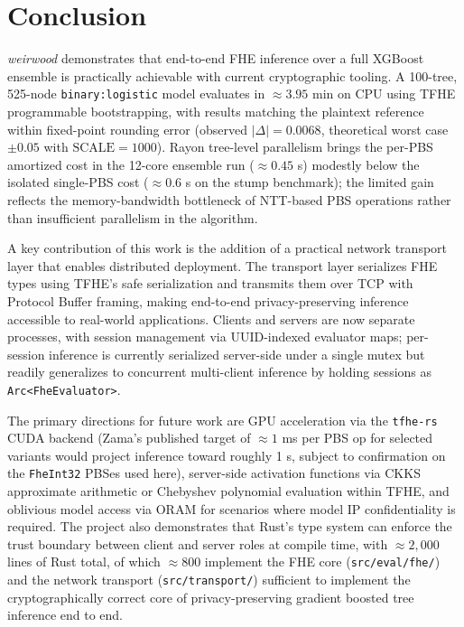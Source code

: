 \documentclass[12pt]{article}
\begin{document}
\section{Conclusion}

\textit{weirwood} demonstrates that end-to-end FHE inference over a full XGBoost ensemble is practically achievable with current cryptographic tooling. A 100-tree, 525-node \texttt{binary:logistic} model evaluates in $\approx 3.95$ min on CPU using TFHE programmable bootstrapping, with results matching the plaintext reference within fixed-point rounding error (observed $|\Delta| = 0.0068$, theoretical worst case $\pm 0.05$ with $\text{SCALE} = 1000$). Rayon tree-level parallelism brings the per-PBS amortized cost in the 12-core ensemble run ($\approx 0.45$ s) modestly below the isolated single-PBS cost ($\approx 0.6$ s on the stump benchmark); the limited gain reflects the memory-bandwidth bottleneck of NTT-based PBS operations rather than insufficient parallelism in the algorithm.

A key contribution of this work is the addition of a practical network transport layer that enables distributed deployment. The transport layer serializes FHE types using TFHE's safe serialization and transmits them over TCP with Protocol Buffer framing, making end-to-end privacy-preserving inference accessible to real-world applications. Clients and servers are now separate processes, with session management via UUID-indexed evaluator maps; per-session inference is currently serialized server-side under a single mutex but readily generalizes to concurrent multi-client inference by holding sessions as \texttt{Arc<FheEvaluator>}.

The primary directions for future work are GPU acceleration via the \texttt{tfhe-rs} CUDA backend (Zama's published target of $\approx 1$ ms per PBS op for selected variants would project inference toward roughly 1 s, subject to confirmation on the \texttt{FheInt32} PBSes used here), server-side activation functions via CKKS approximate arithmetic \cite{ckks} or Chebyshev polynomial evaluation within TFHE, and oblivious model access via ORAM for scenarios where model IP confidentiality is required. The project also demonstrates that Rust's type system can enforce the trust boundary between client and server roles at compile time, with $\approx 2{,}000$ lines of Rust total, of which $\approx 800$ implement the FHE core (\texttt{src/eval/fhe/}) and the network transport (\texttt{src/transport/}) sufficient to implement the cryptographically correct core of privacy-preserving gradient boosted tree inference end to end.
\end{document}
